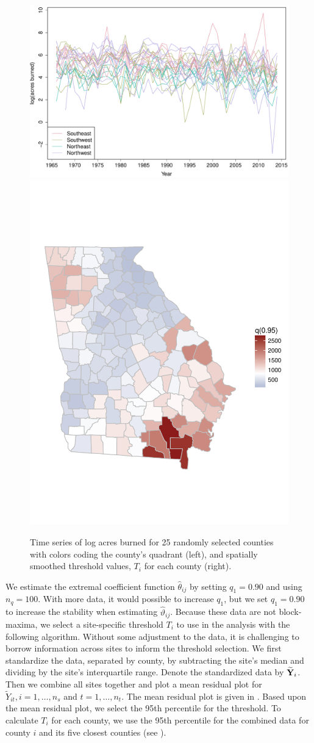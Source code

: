 \documentclass[11pt]{article}
\begin{document}
\begin{figure}[htbp]  %
  \centering
  \includegraphics[width=0.55\linewidth]{plots/fire-spag-rand-25}
  \includegraphics[width=0.44\linewidth, trim = 0 8em 0 10em]{plots/fire-spatial-q95.pdf}
  \caption{Time series of log acres burned for 25 randomly selected counties with colors coding the county's quadrant (left), and spatially smoothed threshold values, $T_i$ for each county (right).}
  \label{ebfig:firets25}
\end{figure}

We estimate the extremal coefficient function $\hat{\theta}_{ij}$ by setting $q_1 = 0.90$ and using $n_q = 100$.
With more data, it would possible to increase $q_1$, but we set $q_1 = 0.90$ to increase the stability when estimating $\hat{\vartheta}_{ij}$.
Because these data are not block-maxima, we select a site-specific threshold $T_i$ to use in the analysis with the following algorithm.
Without some adjustment to the data, it is challenging to borrow information across sites to inform the threshold selection.
We first standardize the data, separated by county, by subtracting the site's median and dividing by the site's interquartile range.
Denote the standardized data by $\widetilde{\mbox{\bf Y}}_i$.
Then we combine all sites together and plot a mean residual plot for $\widetilde{Y}_{it}, i = 1, \ldots, n_s$ and $t = 1, \ldots, n_t$.
The mean residual plot is given in .
Based upon the mean residual plot, we select the 95th percentile for the threshold.
To calculate $T_i$ for each county, we use the 95th percentile for the combined data for county $i$ and its five closest counties (see ).
\end{document}
